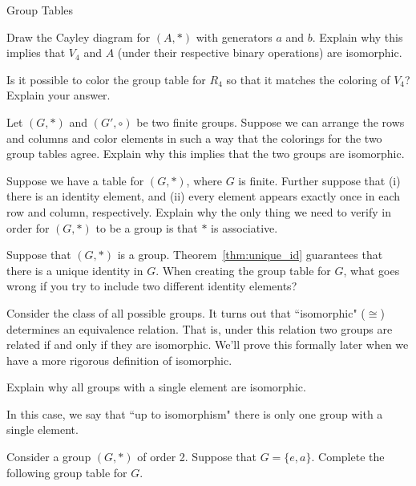 \begin{section}{Group Tables}
\begin{exercise}
Draw the Cayley diagram for $(A,*)$ with generators $a$ and $b$.  Explain why this implies that $V_4$ and $A$ (under their respective binary operations) are isomorphic.  
\end{exercise}

\begin{exercise}
Is it possible to color the group table for $R_4$ so that it matches the coloring of $V_4$?  Explain your answer.
\end{exercise}

\begin{problem}\label{prob:iso_same_group_table}
Let $(G,*)$ and $(G',\circ)$ be two finite groups.  Suppose we can arrange the rows and columns and color elements in such a way that the colorings for the two group tables agree.  Explain why this implies that the two groups are isomorphic.
\end{problem}

\begin{problem}
Suppose we have a table for $(G,*)$, where $G$ is finite.  Further suppose that (i) there is an identity element, and (ii) every element appears exactly once in each row and column, respectively.  Explain why the only thing we need to verify in order for $(G,*)$ to be a group is that $*$ is associative.
\end{problem}

\begin{problem}%
Suppose that $(G,*)$ is a group.  Theorem~\ref{thm:unique_id} guarantees that there is a unique identity in $G$.  When creating the group table for $G$, what goes wrong if you try to include two different identity elements?
\end{problem}

Consider the class of all possible groups.  It turns out that ``isomorphic" ($\cong$) determines an equivalence relation.  That is, under this relation two groups are related if and only if they are isomorphic.  We'll prove this formally later when we have a more rigorous definition of isomorphic.

\begin{problem}
Explain why all groups with a single element are isomorphic.
\end{problem}

In this case, we say that ``up to isomorphism" there is only one group with a single element.

\begin{problem}
Consider a group $(G,*)$ of order 2.  Suppose that $G=\{e,a\}$.  Complete the following group table for $G$.


\end{problem}
\end{section}
